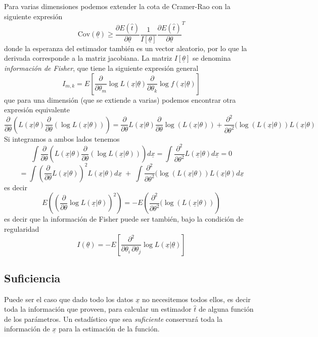 \documentclass{article}
\numberwithin{equation}{section} %
\begin{document}
Para varias dimensiones podemos extender la cota de Cramer-Rao con la siguiente expresión
\begin{equation}
\text{Cov}(\underline{\theta}) \geq \frac{\partial E(\hat{t})}{\partial \underline{\theta}} \frac{1}{I[\underline{\theta}]} \frac{\partial E(\hat{t})}{\partial \underline{\theta}}^T
\end{equation}
donde la esperanza del estimador también es un vector aleatorio, por lo que la derivada corresponde a la matriz jacobiana. La matriz $I[\underline{\theta}]$ se denomina \emph{información de Fisher}, que tiene la siguiente expresión general
\begin{equation}
I_{m, k} = E\left[
 \frac{\partial }{\partial \theta_m} \log L\left(\underline{x}|\underline{\theta}\right)
 \frac{\partial }{\partial \theta_k} \log f\left(\underline{x}| \underline{\theta}\right)
\right]
\end{equation}
que para una dimensión (que se extiende a varias) podemos encontrar otra expresión equivalente
\[\frac{\partial}{\partial \theta} \left( L(\underline{x}|\theta) \frac{\partial}{\partial \theta}(\log L(\underline{x}|\theta)) \right) = \frac{\partial}{\partial \theta} L(\underline{x}|\theta) \frac{\partial }{\partial \theta} \log(L(\underline{x}|\theta)) + \frac{\partial^2}{\partial \theta^2}(\log(L(\underline{x}|\theta)) L(\underline{x}|\theta)\]
Si integramos a ambos lados tenemos
\[\int \frac{\partial}{\partial \theta} \left( L(\underline{x}|\theta) \frac{\partial}{\partial \theta}(\log L(\underline{x}|\theta)) \right) d\underline{x} = \int \frac{\partial^2}{\partial \theta^2} L(\underline{x}|\theta)  d\underline{x} = 0\]
\[= \int \left(\frac{\partial}{\partial \theta} L(\underline{x}|\theta)\right)^2 L(\underline{x}|\theta) d\underline{x} \; + \; \int \frac{\partial^2}{\partial \theta^2}(\log(L(\underline{x}|\theta))  L(\underline{x}|\theta) d\underline{x}\]
es decir
\begin{equation}
E\left(\left(\frac{\partial}{\partial \theta} \log L(\underline{x}|\theta)\right)^2\right) = - E\left(\frac{\partial^2}{\partial \theta^2}(\log(L(\underline{x}|\theta))\right)
\end{equation}
es decir que la información de Fisher puede ser también, bajo la condición de regularidad
\begin{equation}
I(\underline{\theta}) = - E\left[ \frac{\partial^2}{\partial\theta_i \, \partial\theta_j} \log L(\underline{x}|\underline{\theta})\right]
\end{equation}
\subsection{Suficiencia}
Puede ser el caso que dado todo los datos $\underline{x}$ no necesitemos todos ellos, es decir toda la información que proveen, para calcular un estimador $\hat{t}$ de alguna función de los parámetros. Un estadístico que sea \emph{suficiente} conservará toda la información de $\underline{x}$ para la estimación de la función.
\end{document}
